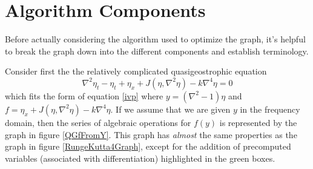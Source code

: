 \documentclass[11pt]{article}
\begin{document}
\section{Algorithm Components}

Before actually considering the algorithm used to optimize the graph, it's helpful to break the graph down into the different components and establish terminology.

Consider first the the relatively complicated quasigeostrophic equation
\begin{equation}
\label{qg}
\nabla^2 \eta_t  -  \eta_t + \eta_x +  J \left( \eta, \nabla^2 \eta \right) - k \nabla^4 \eta = 0
\end{equation}
which fits the form of equation \ref{ivp} where $y=(\nabla^2 -1)\eta$ and $f= \eta_x +  J \left( \eta, \nabla^2 \eta \right) - k \nabla^4 \eta$. If we assume that we are given $y$ in the frequency domain, then the series of algebraic operations for $f(y)$ is represented by the graph in figure \ref{QGfFromY}. This graph has \emph{almost} the same properties as the graph in figure \ref{RungeKutta4Graph}, except for the addition of precomputed variables (associated with differentiation) highlighted in the green boxes.
\end{document}
